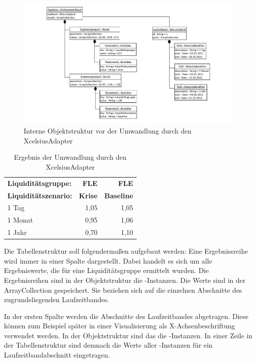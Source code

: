 \begin{onehalfspacing}
\begin{figure}[h]
\centering
\setlength{\unitlength}{1mm}
\includegraphics[width=15cm]{Visio/Entwurf-Objektstruktur.pdf}
\caption{Interne Objektstruktur vor der Umwandlung durch den XcelsiusAdapter \label{fig:objektstruktur}}
\end{figure}


\begin{table}[htbp]
  \centering
  \caption{Ergebnis der Umwandlung durch den XcelsiusAdapter}
    \begin{tabular}{l|r|r}
    \toprule
    \textbf{Liquiditätsgruppe:} & \textbf{FLE} & \textbf{FLE} \\
    \textbf{Liquiditätszenario:} & \textbf{Krise} & \textbf{Baseline} \\
    \midrule
    1 Tag & 1,05  & 1,05 \\
    1 Monat & 0,95  & 1,06 \\
    1 Jahr & 0,70  & 1,10 \\
    \bottomrule
    \end{tabular}%
  \label{tab:zielstruktur}%
\end{table}%

Die Tabellenstruktur soll folgendermaßen aufgebaut werden: Eine Ergebnissreihe wird immer in einer Spalte dargestellt. Dabei handelt es sich um alle Ergebniswerte, die für eine Liquiditätsgruppe ermittelt wurden. Die Ergebnisreihen sind in der Objektstruktur die -Instanzen. Die Werte sind in der ArrayCollection  gespeichert. Sie beziehen sich auf die einzelnen Abschnitte des zugrundeliegenden Laufzeitbandes.

In der ersten Spalte werden die Abschnitte des Laufzeitbandes abgetragen. Diese können zum Beispiel später in einer Visualisierung als X-Achsenbeschriftung verwendet werden. In der Objektstruktur sind das die -Instanzen. In einer Zeile in der Tabellenstruktur sind demnach die Werte aller -Instanzen für ein Laufzeitbandabschnitt eingetragen.


\end{onehalfspacing}
